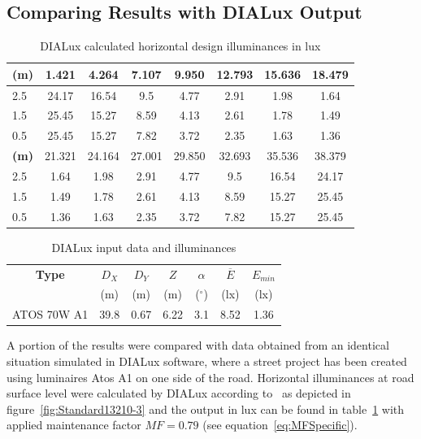 \subsection{Comparing Results with DIALux Output}

\begin{table}[p]
	\renewcommand{\arraystretch}{1.3}
	\caption{DIALux calculated horizontal design illuminances in lux}
 	\label{tab:DialuxOneSideLamps}
	\centering
  \begin{tabular}{ l || c | c | c | c | c | c | c }
    \hline
    \textbf{(m)} & 1.421 & 4.264 & 7.107 & 9.950 & 12.793 & 15.636 & 18.479\\ \hline \hline
    2.5 & 24.17 & 16.54 & 9.5 & 4.77 & 2.91 & 1.98 & 1.64\\ \hline
		1.5 & 25.45 & 15.27 & 8.59 & 4.13 & 2.61 & 1.78 & 1.49\\ \hline
		0.5 & 25.45 & 15.27 & 7.82 & 3.72 & 2.35 & 1.63 & 1.36\\ \hline \hline \hline
		\textbf{(m)} & 21.321 & 24.164 & 27.001 & 29.850 & 32.693 & 35.536 & 38.379\\ \hline \hline
		2.5 & 1.64 & 1.98 & 2.91 & 4.77 & 9.5 & 16.54 & 24.17\\ \hline
		1.5 & 1.49 & 1.78 & 2.61 & 4.13 & 8.59 & 15.27 & 25.45\\ \hline
		0.5 & 1.36 & 1.63 & 2.35 & 3.72 & 7.82 & 15.27 & 25.45\\ \hline
  \end{tabular}
\end{table}

\begin{table}[p]
	\renewcommand{\arraystretch}{1.3}
	\caption{DIALux input data and illuminances}
 	\label{tab:DialuxIlluminances}
	\centering
  \begin{tabular}{ c | c | c | c | c | c | c }
    \hline
    \textbf{Type} & $D_X$ & $D_Y$ & $Z$ & $\alpha$ & $\overline{E}$ & $E_{min}$\\
		& (m) & (m) & (m) & ($^\circ$) & (lx) & (lx)\\ \hline
    ATOS 70W A1 & 39.8 & 0.67 & 6.22 & 3.1 & 8.52 & 1.36\\ \hline
  \end{tabular}
\end{table}

A portion of the results were compared with data obtained from an identical situation simulated in DIALux software, where a street project has been created using luminaires Atos A1 on one side of the road. Horizontal illuminances at road surface level were calculated by DIALux according to~\cite{CSN_EN_13201-3} as depicted in figure~\ref{fig:Standard13210-3} and the output in lux can be found in table~\ref{tab:DialuxOneSideLamps} with applied maintenance factor $MF=0.79$ (see equation~\ref{eq:MFSpecific}).

